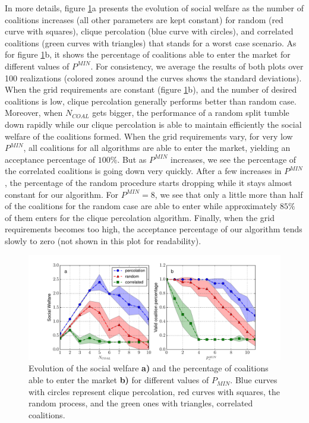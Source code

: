 \documentclass[conference]{IEEEtran}
\begin{document}
In more details, figure \ref{Fig4}a presents the evolution of social welfare as the number of coalitions increases (all other parameters are kept constant) for random (red curve with squares), clique percolation (blue curve with circles), and correlated coalitions (green curves with triangles) that stands for a worst case scenario. As for figure \ref{Fig4}b, it shows the percentage of coalitions able to enter the market for different values of $ P^{MIN} $. For consistency, we average the results of both plots over 100 realizations (colored zones around the curves shows the standard deviations). When the grid requirements are constant (figure \ref{Fig4}b), and the number of desired coalitions is low, clique percolation generally performs better than random case. Moreover, when $ N_{COAL} $ gets bigger, the performance of a random split tumble down rapidly while our clique percolation is able to maintain efficiently the social welfare of the coalitions formed. When the grid requirements vary, for very low $ P^{MIN} $, all coalitions for all algorithms are able to enter the market, yielding an acceptance percentage of $ 100 \% $. But as $ P^{MIN} $ increases, we see the percentage of the correlated coalitions is going down very quickly. After a few increases in $ P^{MIN} $, the percentage of the random procedure starts dropping while it stays almost constant for our algorithm. For $ P^{MIN} = 8 $, we see that only a little more than half of the coalitions for the random case are able to enter while approximately $ 85 \%$ of them enters for the clique percolation algorithm. Finally, when the grid requirements becomes too high, the acceptance percentage of our algorithm tends slowly to zero (not shown in this plot for readability).

\begin{figure}
 \centering
  \includegraphics[scale=0.36]{figure8/fig8_bis.pdf}
  \caption{Evolution of the social welfare \textbf{a)} and the percentage of coalitions able to enter the market \textbf{b)} for different values of $ P_{MIN} $. Blue curves with circles represent clique percolation, red curves with squares, the random process, and the green ones with triangles, correlated coalitions.}
 \label{Fig4}
\end{figure}
\end{document}
